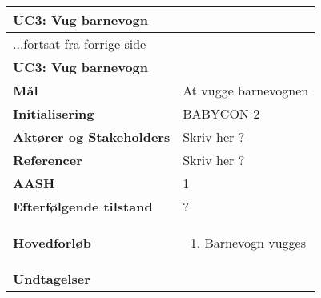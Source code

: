 \begin{center} \centering \label{kravspec:uc3}
	\begin{longtable}{|p{5cm}|p{9cm}|}  %
	\hline
		\multicolumn{2}{|l|}{\textbf{UC3: Vug barnevogn}} \\\hline %
		\endfirsthead
		
		\multicolumn{2}{l}{...fortsat fra forrige side} \\ \hline %
		\multicolumn{2}{|l|}{\textbf{UC3: Vug barnevogn}} \\\hline %
		\endhead	
		
		\textbf{Mål}							&At vugge barnevognen		\\\hline
		\textbf{Initialisering}				&BABYCON 2 		\\\hline
		\textbf{Aktører og Stakeholders}		&Skriv her ?		\\\hline 
		\textbf{Referencer}					&Skriv her ?		\\\hline
		\textbf{AASH}						&1		\\\hline
		\textbf{Efterfølgende tilstand}		&?	\\\hline
		\textbf{Hovedforløb}					
			&\begin{enumerate}
	
				\item  Barnevogn vugges
				
				
				
			\end{enumerate}
		\\\hline
		\textbf{Undtagelser}
			

				

		\\\hline
	\end{longtable} 
\end{center}

